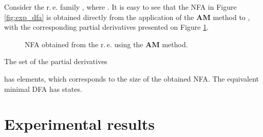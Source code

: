 \documentclass[copyright]{eptcs}
\newcommand{\dfa}{DFA\xspace}
\newcommand{\nfa}{NFA\xspace}
\newcommand{\re}{r.\,e.\xspace}
\newcommand{\am}{\textbf{AM}\xspace}
\begin{document}
Consider the \re family , where . It is easy to see
that the \nfa in Figure \ref{fig:exp_dfa} is obtained directly from
the application of the \am method to , with the corresponding
partial derivatives presented on Figure \ref{fig:pd_nfa}.
\begin{figure}[ht]
  \begin{center}
  \end{center}\vspace{1mm}
  \caption{\nfa obtained from the \re  using the \am method.}
  \label{fig:pd_nfa}
\end{figure}

The set of the partial derivatives

has 
elements, which corresponds to the size of the obtained \nfa. The
equivalent minimal \dfa has  states.










\section{Experimental results}
\label{sec:experimental}
\end{document}

